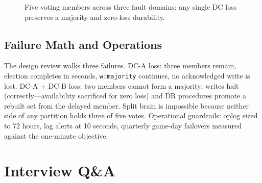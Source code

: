 \begin{figure}[H]
    \centering
    \caption{Five voting members across three fault domains: any single DC loss preserves a majority and zero-loss durability.}
    \label{fig:ch9-banking}
\end{figure}

\subsection{Failure Math and Operations}
The design review walks three failures. DC-A loss: three members remain, election completes in seconds, \texttt{w:majority} continues, no acknowledged write is lost. DC-A + DC-B loss: two members cannot form a majority; writes halt (correctly---availability sacrificed for zero loss) and DR procedures promote a rebuilt set from the delayed member. Split brain is impossible because neither side of any partition holds three of five votes. Operational guardrails: oplog sized to 72 hours, lag alerts at 10 seconds, quarterly game-day failovers measured against the one-minute objective.

\section{Interview Q\&A}
